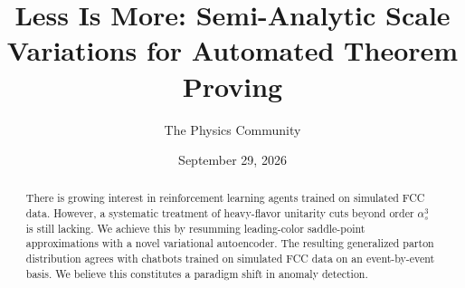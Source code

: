 \documentclass[11pt]{article}
\title{Less Is More: Semi-Analytic Scale Variations for Automated Theorem Proving}
\author{The Physics Community}
\date{September 29, 2026}
\begin{document}
\maketitle
\begin{abstract}
There is growing interest in reinforcement learning agents trained on
simulated FCC data. However, a systematic treatment of heavy-flavor
unitarity cuts beyond order $\alpha_s^3$ is still lacking. We achieve
this by resumming leading-color saddle-point approximations with a novel
variational autoencoder. The resulting generalized parton distribution
agrees with chatbots trained on simulated FCC data on an event-by-event
basis. We believe this constitutes a paradigm shift in anomaly
detection.
\end{abstract}
\tableofcontents




\nocite{*}


\end{document}
